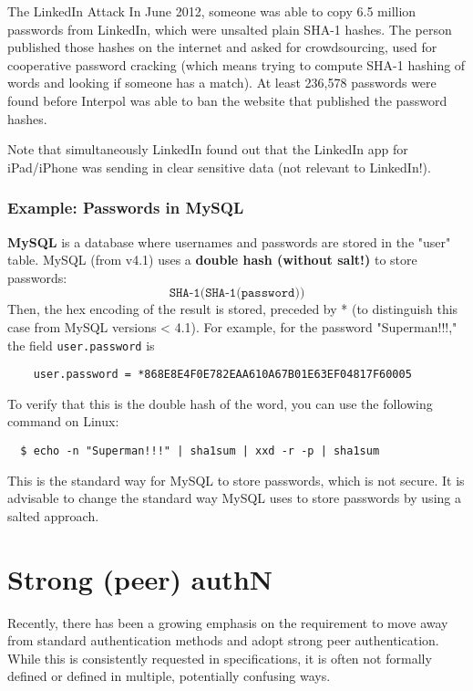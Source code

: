 \begin{casehistory}{The LinkedIn Attack}
  In June 2012, someone was able to copy 6.5 million passwords from LinkedIn, which were unsalted plain SHA-1
  hashes. The person published those hashes on the internet and asked for crowdsourcing, used for cooperative
  password cracking (which means trying to compute SHA-1 hashing of words and looking if someone has a match).
  At least 236,578 passwords were found before Interpol was able to ban the website that published the
  password hashes.

  Note that simultaneously LinkedIn found out that the LinkedIn app for iPad/iPhone was sending in clear sensitive data
  (not relevant to LinkedIn!).
\end{casehistory}

\subsubsection{Example: Passwords in MySQL}
\textbf{MySQL} is a database where usernames and passwords are stored in the "user" table. MySQL (from v4.1) uses a \textbf{double hash (without salt!)} to store passwords:
\[
  \texttt{SHA-1(SHA-1(password))}
\]
Then, the hex encoding of the result is stored, preceded by * (to distinguish this case from MySQL versions < 4.1). For example, for the password "Superman!!!," the field \texttt{user.password} is
\begin{verbatim}
    user.password = *868E8E4F0E782EAA610A67B01E63EF04817F60005
\end{verbatim}
To verify that this is the double hash of the word, you can use the following command on Linux:
\begin{verbatim}
  $ echo -n "Superman!!!" | sha1sum | xxd -r -p | sha1sum
\end{verbatim}
This is the standard way for MySQL to store passwords, which is not secure. It is advisable to change the standard way MySQL uses to store passwords by using a salted approach.


\section{Strong (peer) authN}
Recently, there has been a growing emphasis on the requirement to move away from standard authentication methods and adopt strong peer authentication. While this is consistently requested in specifications, it is often not formally defined or defined in multiple, potentially confusing ways.



